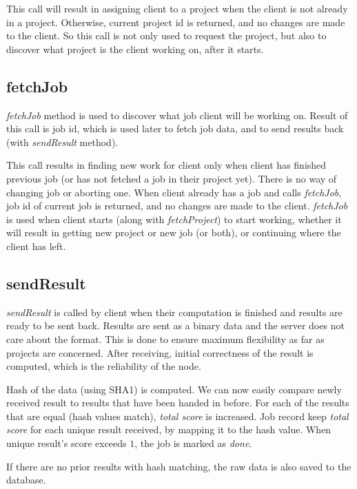 This call will result in assigning client to a project when the client is not already in a project. Otherwise, current project id is returned, and no changes are made to the client. So this call is not only used to request the project, but also to discover what project is the client working on, after it starts.

\subsection{fetchJob}

\emph{fetchJob} method is used to discover what job client will be working on. Result of this call is job id, which is used later to fetch job data, and to send results back (with \emph{sendResult} method).

This call results in finding new work for client only when client has finished previous job (or has not fetched a job in their project yet). There is no way of changing job or aborting one. When client already has a job and calls \emph{fetchJob}, job id of current job is returned, and no changes are made to the client. \emph{fetchJob} is used when client starts (along with \emph{fetchProject}) to start working, whether it will result in getting new project or new job (or both), or continuing where the client has left.

\subsection{sendResult}

\emph{sendResult} is called by client when their computation is finished and results are ready to be sent back. Results are sent as a binary data and the server does not care about the format. This is done to ensure maximum flexibility as far as projects are concerned. After receiving, initial correctness of the result is computed, which is the reliability of the node. 

Hash of the data (using SHA1) is computed. We can now easily compare newly received result to results that have been handed in before. For each of the results that are equal (hash values match), \emph{total score} is increased. Job record keep \emph{total score} for each unique result received, by mapping it to the hash value. When unique result's score exceeds $1$, the job is marked as \emph{done}.

If there are no prior results with hash matching, the raw data is also saved to the database.

